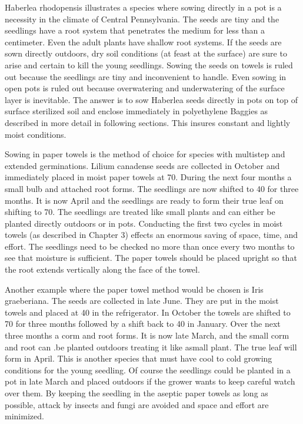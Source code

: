 Haberlea rhodopensis illustrates a species where sowing directly in a pot is a
necessity in the climate of Central Pennsylvania. The seeds are tiny and the seedlings
have a root system that penetrates the medium for less than a centimeter. Even the
adult plants have shallow root systems. If the seeds are sown directly outdoors, dry
soil conditions (at feast at the surface) are sure to arise and certain to kill the young
seedlings. Sowing the seeds on towels is ruled out because the seedlings are tiny
and inconvenient to handle. Even sowing in open pots is ruled out because
overwatering and underwatering of the surface layer is inevitable. The answer is to
sow Haberlea seeds directly in pots on top of surface sterilized soil and enclose
immediately in polyethylene Baggies as described in more detail in following sections.
This insures constant and lightly moist conditions.

Sowing in paper towels is the method of choice for species with multistep and
extended germinations. Lilium canadense seeds are collected in October and
immediately placed in moist paper towels at 70. During the next four months a small
bulb and attached root forms. The seedlings are now shifted to 40 for three months. It
is now April and the seedlings are ready to form their true leaf on shifting to 70. The
seedlings are treated like small plants and can either be planted directly outdoors or in
pots. Conducting the first two cycles in moist towels (as described in Chapter 3) effects
an enormous saving of space, time, and effort. The seedlings need to be checked no
more than once every two months to see that moisture is sufficient. The paper towels
should be placed upright so that the root extends vertically along the face of the towel.

Another example where the paper towel method would be chosen is Iris
graeberiana. The seeds are collected in late June. They are put in the moist towels
and placed at 40 in the refrigerator. In October the towels are shifted to 70 for three
months followed by a shift back to 40 in January. Over the next three months a corm
and root forms. It is now late March, and the small corm and root can .be planted
outdoors treating it like asmall plant. The true leaf will form in April. This is another
species that must have cool to cold growing conditions for the young seedling. Of
course the seedlings could be planted in a pot in late March and placed outdoors if the
grower wants to keep careful watch over them. By keeping the seedling in the aseptic
paper towels as long as possible, attack by insects and fungi are avoided and space
and effort are minimized.

